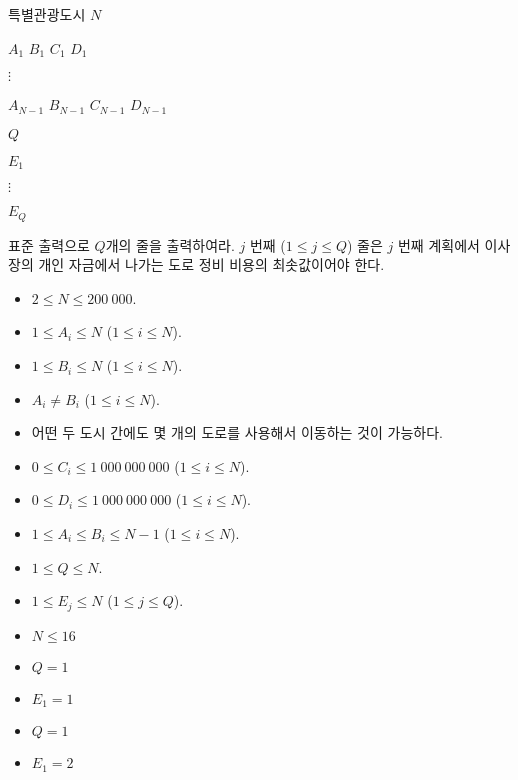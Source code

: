 \begin{problem}{특별관광도시}
	$N$
	
	$A_1$ $B_1$ $C_1$ $D_1$
	
	$\vdots$
	
	$A_{N-1}$ $B_{N-1}$ $C_{N-1}$ $D_{N-1}$

	$Q$
	
	$E_1$
	
	$\vdots$
	
	$E_Q$
	
	\OutputFile
	
	표준 출력으로 $Q$개의 줄을 출력하여라. $j$ 번째 ($1 \le j \le Q$) 줄은 $j$ 번째 계획에서 이사장의 개인 자금에서 나가는 도로 정비 비용의 최솟값이어야 한다.
	
	\Constraints
	
	\begin{itemize}
	
	\item $2 \le N \le 200\ 000$.
	\item $1 \le A_i \le N$ ($1 \le i \le N$).
	\item $1 \le B_i \le N$ ($1 \le i \le N$).
	\item $A_i \ne B_i$ ($1 \le i \le N$).
	\item 어떤 두 도시 간에도 몇 개의 도로를 사용해서 이동하는 것이 가능하다.
	\item $0 \le C_i \le 1\ 000\ 000\ 000$ ($1 \le i \le N$).
	\item $0 \le D_i \le 1\ 000\ 000\ 000$ ($1 \le i \le N$).
	\item $1 \le A_i \le B_i \le N-1$ ($1 \le i \le N$).
	\item $1 \le Q \le N$.
	\item $1 \le E_j \le N$ ($1 \le j \le Q$).
		
	\end{itemize}
	
	
	\begin{itemize}
		\item $N \le 16$
	\end{itemize}
	
	\begin{itemize}
		\item $Q = 1$
		\item $E_1 = 1$
	\end{itemize}


	\begin{itemize}
		\item $Q = 1$
		\item $E_1 = 2$
	\end{itemize}
	

\end{problem}
